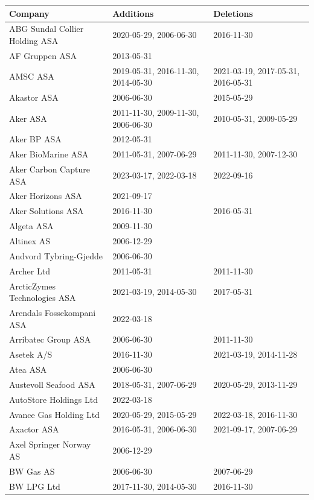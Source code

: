 \begin{table}[H]
\centering
\begin{tabularx}{\textwidth}{XXX}
\toprule
Company & Additions & Deletions \\ 
\midrule
ABG Sundal Collier Holding ASA & 2020-05-29, 2006-06-30 & 2016-11-30 \\ 
AF Gruppen ASA & 2013-05-31 &  \\ 
AMSC ASA & 2019-05-31, 2016-11-30, 2014-05-30 & 2021-03-19, 2017-05-31, 2016-05-31 \\ 
Akastor ASA & 2006-06-30 & 2015-05-29 \\ 
Aker ASA & 2011-11-30, 2009-11-30, 2006-06-30 & 2010-05-31, 2009-05-29 \\ 
Aker BP ASA & 2012-05-31 &  \\ 
Aker BioMarine ASA & 2011-05-31, 2007-06-29 & 2011-11-30, 2007-12-30 \\ 
Aker Carbon Capture ASA & 2023-03-17, 2022-03-18 & 2022-09-16 \\ 
Aker Horizons ASA & 2021-09-17 &  \\ 
Aker Solutions ASA & 2016-11-30 & 2016-05-31 \\ 
Algeta ASA & 2009-11-30 &  \\ 
Altinex AS & 2006-12-29 &  \\ 
Andvord Tybring-Gjedde & 2006-06-30 &  \\ 
Archer Ltd & 2011-05-31 & 2011-11-30 \\ 
ArcticZymes Technologies ASA & 2021-03-19, 2014-05-30 & 2017-05-31 \\ 
Arendals Fossekompani ASA & 2022-03-18 &  \\ 
Arribatec Group ASA & 2006-06-30 & 2011-11-30 \\ 
Asetek A/S & 2016-11-30 & 2021-03-19, 2014-11-28 \\ 
Atea ASA & 2006-06-30 &  \\ 
Austevoll Seafood ASA & 2018-05-31, 2007-06-29 & 2020-05-29, 2013-11-29 \\ 
AutoStore Holdings Ltd & 2022-03-18 &  \\ 
Avance Gas Holding Ltd & 2020-05-29, 2015-05-29 & 2022-03-18, 2016-11-30 \\ 
Axactor ASA & 2016-05-31, 2006-06-30 & 2021-09-17, 2007-06-29 \\ 
Axel Springer Norway AS & 2006-12-29 &  \\ 
BW Gas AS & 2006-06-30 & 2007-06-29 \\ 
BW LPG Ltd & 2017-11-30, 2014-05-30 & 2016-11-30 \\ 

\end{tabularx}
\end{table}
